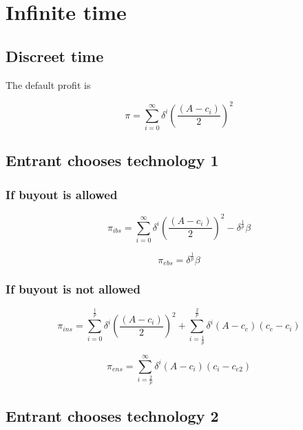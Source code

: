 \documentclass{article}
\begin{document}
\section{Infinite time}

\subsection{Discreet time}

The default profit is 

\begin{equation*}
\pi=\sum^{\infty}_{i=0} \delta^i \left(\frac{(A-c_i)}{2} \right)^2
\end{equation*}

\subsection*{Entrant chooses technology 1}

\subsubsection{If buyout is allowed}

\begin{equation*}
\pi_{ibs}=\sum^{\infty}_{i=0} \delta^i \left(\frac{(A-c_i)}{2} \right)^2 - \delta^{\frac{1}{p}} \beta 
\end{equation*}

\begin{equation*}
\pi_{ebs} = \delta^{\frac{1}{p}} \beta 
\end{equation*}

\subsubsection{If buyout is not allowed}

\begin{equation*}
\pi_{ins} =\sum^{\frac{1}{p}}_{i=0} \delta^i \left(\frac{(A-c_i)}{2} \right)^2 
+
\sum^{\frac{2}{p}}_{i=\frac{1}{p}} \delta^i (A-c_e)(c_e-c_i) 
\end{equation*}

\begin{equation*}
\pi_{ens} = \sum^{\infty}_{i=\frac{2}{p}} \delta^i (A-c_i)(c_i-c_{e2}) 
\end{equation*}

\subsection*{Entrant chooses technology 2}
\end{document}
